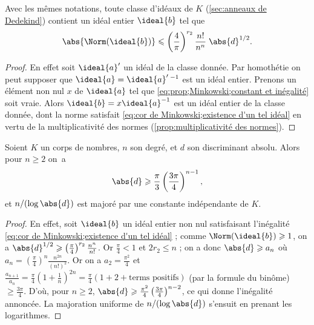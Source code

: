 \documentclass[11pt, %
  title in boldface,
  theorem in new line,
  theorem numbering = section,
  number theorems separately,
  simple name,
]{beaulivre}
\begin{document}
\vspace{-.5\baselineskip}
    \begin{corollary}\label{cor:Minkowski;existence d'un tel idéal}
        Avec les mêmes notations, toute classe d'idéaux de \( K \) (\cref{sec:anneaux de Dedekind}) contient un idéal entier \( \ideal{b} \) tel que
        \begin{equation}\label{eq:cor de Minkowski;existence d'un tel idéal}
            \abs{\Norm(\ideal{b})} \leqslant \left(\frac{4}{\pi}\right)^{r_2} \frac{n!}{n^n} \; \abs{d}^{1/2}.
        \end{equation}
    \end{corollary}
    \begin{proof}
        En effet soit \( \ideal{a}' \) un idéal de la classe donnée. Par homothétie on peut supposer que \( \ideal{a} = \ideal{a}'\,{}^{-1} \) est un idéal entier. Prenons un élément non nul \( x \) de \( \ideal{a} \) tel que \eqref{eq:prop;Minkowski;constant et inégalité} soit vraie. Alors \( \ideal{b} = x \ideal{a}^{-1} \) est un idéal entier de la classe donnée, dont la norme satisfait \eqref{eq:cor de Minkowski;existence d'un tel idéal} en vertu de la multiplicativité des normes (\cref{prop:multiplicativité des normes}).
    \end{proof}

    \begin{corollary}\label{cor:Minkowski;discriminant absolu}
        Soient \( K \) un corps de nombres, \( n \) son degré, et \( d \) son discriminant absolu. Alors pour \( n \geqslant 2 \) on~a
        \[
            \abs{d} \geqslant \frac{\pi}{3} \left(\frac{3\pi}{4}\right)^{n-1},
        \]
        et \( n/(\log \abs{d}) \) est majoré par une constante indépendante de \( K \).
    \end{corollary}
    \begin{proof}
        En effet, soit \( \ideal{b} \) un idéal entier non nul satisfaisant l'inégalité \eqref{eq:cor de Minkowski;existence d'un tel idéal} ; comme \( \Norm(\ideal{b}) \geqslant 1 \), on a \( \abs{d}^{1/2} \geqslant \left(\frac{\pi}{4}\right)^{r_2} \frac{n^n}{n!} \). Or \( \frac{\pi}{4} < 1 \) et \( 2r_2 \leqslant n \) ; on a donc \( \abs{d} \geqslant a_n \) où \( a_n = \left(\frac{\pi}{4}\right)^n \frac{n^{2n}}{(n!)^2} \). Or on a \( a_2 = \frac{\pi^2}{4} \) et \( \frac{a_{n+1}}{a_n} = \frac{\pi}{4} \left(1+\frac{1}{n}\right)^{2n} = \frac{\pi}{4} (1+2+\text{terms positifs}) \) (par la formule du binôme) \( \geqslant \frac{3\pi}{4} \). D'où, pour \( n \geqslant 2 \), \( \abs{d} \geqslant \frac{\pi^2}{4} \left(\frac{3\pi}{4}\right)^{n-2} \), ce qui donne l'inégalité annoncée. La majoration uniforme de \( n/(\log \abs{d}) \) s'ensuit en prenant les logarithmes.
    \end{proof}
\end{document}

